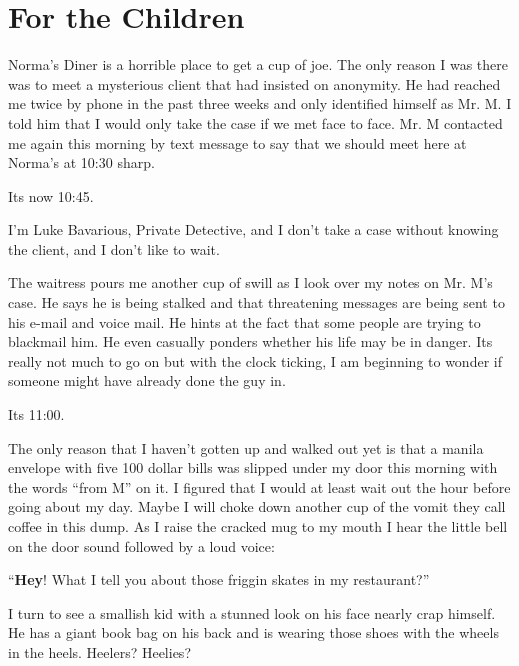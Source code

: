 \chapter{For the Children}


Norma's Diner is a horrible place to get a cup of joe. The only
reason I was there was to meet a mysterious client that had
insisted on anonymity. He had reached me twice by phone in the past
three weeks and only identified himself as Mr. M. I told him that I
would only take the case if we met face to face. Mr. M contacted me
again this morning by text message to say that we should meet here
at Norma's at 10:30 sharp.



Its now 10:45.



I'm Luke Bavarious, Private Detective, and I don't take a case
without knowing the client, and I don't like to wait.



The waitress pours me another cup of swill as I look over my notes
on Mr. M's case. He says he is being stalked and that threatening
messages are being sent to his e-mail and voice mail. He hints at
the fact that some people are trying to blackmail him. He even
casually ponders whether his life may be in danger. Its really not
much to go on but with the clock ticking, I am beginning to wonder
if someone might have already done the guy in.



Its 11:00.



The only reason that I haven't gotten up and walked out yet is that
a manila envelope with five 100 dollar bills was slipped under my
door this morning with the words ``from M'' on it. I figured that I
would at least wait out the hour before going about my day. Maybe I
will choke down another cup of the vomit they call coffee in this
dump. As I raise the cracked mug to my mouth I hear the little bell
on the door sound followed by a loud voice:



``{\bf Hey}! What I tell you about those friggin skates in my
restaurant?''

I turn to see a smallish kid with a stunned look on his face nearly
crap himself. He has a giant book bag on his back and is wearing
those shoes with the wheels in the heels. Heelers? Heelies?




